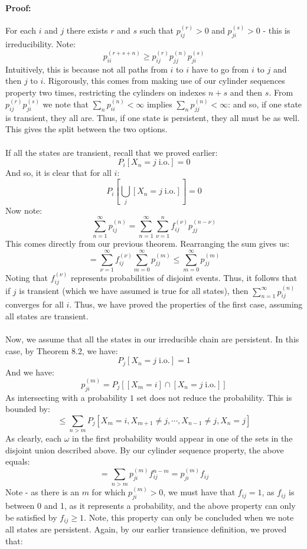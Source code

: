 \documentclass[12pt,a4paper]{article}
\newcommand{\1}[1]{\mathbbm{1}\left\{ #1 \right\}}
\newcommand{\io}{\text{i.o.}}
\begin{document}
\paragraph{Proof:} For each $i$ and $j$ there exists $r$ and $s$ such that $p_{ij}^{(r)} > 0$ and $p_{ji}^{(s)} > 0$ - this is irreducibility. Note:
$$
	p_{ii}^{(r + s + n)} \geq p_{ij}^{(r)}p_{jj}^{(n)}p_{ji}^{(s)}
$$
Intuitively, this is because not all paths from $i$ to $i$ have to go from $i$ to $j$ and then $j$ to $i$. Rigorously, this comes from making use of our cylinder sequences property two times, restricting the cylinders on indexes $n + s$ and then $s$. From $p_{ij}^{(r)}p_{ji}^{(s)}$ we note that $\sum_n p_{ii}^{(n)} < \infty$ implies $\sum_n p_{jj}^{(n)} < \infty$: and so, if one state is transient, they all are. Thus, if one state is persistent, they all must be as well. This gives the split between the two options.
\\\\
If all the states are transient, recall that we proved earlier:
$$
	P_i\left[X_n = j \; \io\right] = 0
$$
And so, it is clear that for all $i$:
$$
	P_i\left[\bigcup_j [X_n = j \; \io]\right] = 0
$$
Now note:
$$
	\sum_{n=1}^\infty p_{ij}^{(n)} = \sum_{n=1}^\infty \sum_{\nu = 1}^n f_{ij}^{(\nu)} p_{jj}^{(n - \nu)}
$$
This comes directly from our previous theorem. Rearranging the sum gives us:
$$
	= \sum_{\nu = 1}^\infty f_{ij}^{(\nu)} \sum_{m = 0}^\infty p_{jj}^{(m)} \leq \sum_{m = 0}^\infty p_{jj}^{(m)}
$$
Noting that $f_{ij}^{(\nu)}$ represents probabilities of disjoint events. Thus, it follows that if $j$ is transient (which we have assumed is true for all states), then $\sum_{n=1}^\infty p_{ij}^{(n)}$ converges for all $i$. Thus, we have proved the properties of the first case, assuming all states are transient.
\\\\
Now, we assume that all the states in our irreducible chain are persistent. In this case, by Theorem 8.2, we have:
$$
	P_j\left[X_n = j \; \io\right] = 1
$$
And we have:
$$
	p_{ji}^{(m)} = P_j\left[[X_m = i] \cap [X_n = j \; \io]\right]
$$
As intersecting with a probability $1$ set does not reduce the probability. This is bounded by:
$$
	\leq \sum_{n > m} P_j\left[X_m = i, X_{m + 1} \neq j, \cdots, X_{n - 1} \neq j, X_n = j\right]
$$
As clearly, each $\omega$ in the first probability would appear in one of the sets in the disjoint union described above. By our cylinder sequence property, the above equals:
$$
	= \sum_{n > m} p_{ji}^{(m)}f_{ij}^{n - m} = p_{ji}^{(m)}f_{ij}
$$
Note - as there is an $m$ for which $p_{ji}^{(m)} > 0$, we must have that $f_{ij} = 1$, as $f_{ij}$ is between 0 and 1, as it represents a probability, and the above property can only be satisfied by $f_{ij} \geq 1$. Note, this property can only be concluded when we note all states are persistent. Again, by our earlier transience definition, we proved that:
\end{document}
